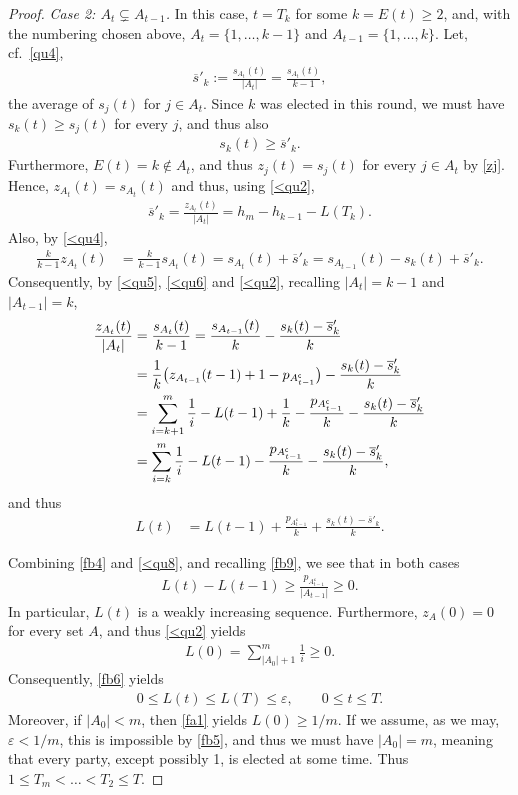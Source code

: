 \documentclass[11pt,reqno,tbtags,a4paper]{amsart}
\numberwithin{equation}{section}
\renewcommand\le{\leq}
\renewcommand\ge{\geq}
\renewcommand\leq{\leqslant}
\renewcommand\geq{\geqslant}
\theoremstyle{plain}%
\theoremstyle{definition}
\theoremstyle{remark}
\newcounter{cases}
\newcommand\pfcase[2]{\smallskip\noindent\emph{Case #1: #2} \noindent}
\newcommand\set[1]{\ensuremath{\{#1\}}}
\newcommand\bigpar[1]{\bigl(#1\bigr)}
\newcommand\eps{\varepsilon}
\newcommand\cp{^{\mathsf c}}
\newcommand\bsk{\overline{s}'_k}
\newcommand\0{{\boldsymbol 0}}
\newcommand\1{{\boldsymbol 1}}
\begin{document}
\begin{proof}
\pfcase2{$A_t\subsetneq A_{t-1}$.}
In this case, 
$t=T_k$ for some $k=E(t)\ge2$, and, 
with the numbering chosen above,
$A_t=\set{1,\dots,k-1}$ and  $A_{t-1}=\set{1,\dots,k}$.
Let, cf.\ \eqref{qu4}, 
\begin{align}\label{<qu4}
\bsk:=\frac{s_{A_{t}}(t)}{|A_{t}|}
=\frac{s_{A_{t}}(t)}{k-1}
%
%
,\end{align}
the average of $s_j(t)$ for $j\in A_{t}$.
Since $k$ was elected in this round, we must have $s_k(t)\ge s_j(t)$ for
every $j$, and thus also 
\begin{align}
  \label{fb9}
s_k(t)\ge \bsk.
\end{align}
Furthermore, $E(t)=k\notin A_t$, and thus $z_j(t)=s_j(t)$ for every $j\in
A_t$ by \eqref{zj}. 
Hence, $z_{A_t}(t)=s_{A_t}(t)$ and thus, using \eqref{<qu2},
\begin{align}\label{fb7}
 \bsk= \frac{z_{A_{t}}(t)}{|A_{t}|}
=h_m - h_{k-1} - L(T_k) 
.\end{align}
Also, by \eqref{<qu4},
\begin{align}\label{<qu5}
\frac{k}{k-1}z_{A_t}(t)&
=\frac{k}{k-1}s_{A_t}(t)
=s_{A_t}(t)+\bsk
=s_{A_{t-1}}(t)-s_k(t)+\bsk
.
\end{align}
Consequently, by \eqref{<qu5}, \eqref{<qu6}  and \eqref{<qu2},
recalling $|A_{t}|=k-1$ and $|A_{t-1}|=k$,
\begin{align}\label{<qu7}
\frac{z_{A_t}(t)}{|A_t|}
&
=
\frac{s_{A_t}(t)}{k-1}
=
\frac{s_{A_{t-1}}(t)}k-\frac{s_k(t)-\bsk}k
\notag\\&
= \frac{1}{k}\bigpar{z_{A_{t-1}}(t-1) 
+1
-p_{A\cp_{t-1}}}
-\frac{s_k(t)-\bsk}{k}
\notag\\&
= \sum_{i=k+1}^m\frac{1}i -L(t-1)
+\frac{1}{k}
-\frac{p_{A\cp_{t-1}}}k
-\frac{s_k(t)-\bsk}{k}
\notag\\&
= \sum_{i=k}^m\frac{1}i
-L(t-1)
-\frac{p_{A\cp_{t-1}}}k
-\frac{s_k(t)-\bsk}{k}
,\end{align}
and thus
\begin{align}\label{<qu8}
L(t)
&
=
L(t-1)
+\frac{p_{A\cp_{t-1}}}k
+\frac{s_k(t)-\bsk}{k}
%
.\end{align}

Combining \eqref{fb4} and \eqref{<qu8}, 
and recalling \eqref{fb9},
we see that in both cases
\begin{align}\label{<qu88}
L(t)
-
L(t-1)
\ge
\frac{p_{A\cp_{t-1}}}{|A_{t-1}|}
\ge0.
\end{align}
In particular, $L(t)$ is a weakly increasing sequence.
Furthermore, $z_{A}(0)=0$ for every set $A$, and thus \eqref{<qu2} yields
\begin{align}\label{fa1}
  L(0)=\sum_{|A_0|+1}^m\frac{1}{i}
\ge0
.\end{align}
Consequently, \eqref{fb6} yields 
\begin{align}\label{fb5}
0\le L(t)\le L(T)\le \eps,
\qquad 0\le t \le T
.\end{align}
Moreover,
if $|A_0|<m$, then \eqref{fa1} yields $L(0)\ge 1/m$. 
If we assume, as we may, 
$\eps<1/m$, this is impossible by \eqref{fb5}, and thus
we must have $|A_0|=m$, meaning that every party, except possibly 1, is
elected at some time. Thus $1\le T_m < \dots <T_2 \le T$.


\end{proof}
\end{document}
